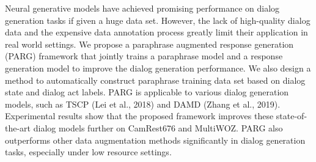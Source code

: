 Neural generative models have achieved promising performance on dialog generation tasks if given a huge data set. However, the lack of high-quality dialog data and the expensive data annotation process greatly limit their application in real world settings. We propose a paraphrase augmented response generation (PARG) framework that jointly trains a paraphrase model and a response generation model to improve the dialog generation performance. We also design a method to automatically construct paraphrase training data set based on dialog state and dialog act labels.  PARG is applicable to various dialog generation models, such as TSCP (Lei et al., 2018) and DAMD (Zhang et al., 2019). Experimental results show that the proposed framework improves these state-of-the-art dialog models further on CamRest676 and MultiWOZ. PARG also outperforms other data augmentation methods significantly in dialog generation tasks, especially under low resource settings.
